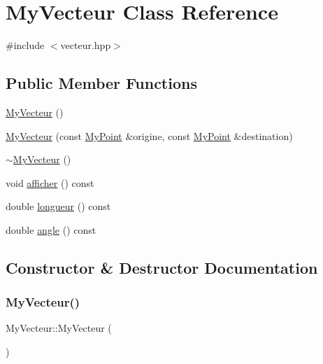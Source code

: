 \hypertarget{classMyVecteur}{}\section{My\+Vecteur Class Reference}
\label{classMyVecteur}


{\ttfamily \#include $<$vecteur.\+hpp$>$}

\subsection*{Public Member Functions}
\begin{DoxyCompactItemize}
\item 
\hyperlink{classMyVecteur_a6318886a52f3a09f30aecbbfc5e56121}{My\+Vecteur} ()
\item 
\hyperlink{classMyVecteur_a4e2be89ea76ce4e062603a1a5f139eb7}{My\+Vecteur} (const \hyperlink{classMyPoint}{My\+Point} \&origine, const \hyperlink{classMyPoint}{My\+Point} \&destination)
\item 
\hyperlink{classMyVecteur_aed208f92ee2d2f6e9c316f9688349c37}{$\sim$\+My\+Vecteur} ()
\item 
void \hyperlink{classMyVecteur_a1a7d4d738cc650239c18d0f1c0d88e3f}{afficher} () const
\item 
double \hyperlink{classMyVecteur_a11c7da61089ff7495cc81b78cfcfdd7a}{longueur} () const
\item 
double \hyperlink{classMyVecteur_a20233c42b105ad8f1fd4a62d2d005568}{angle} () const
\end{DoxyCompactItemize}


\subsection{Constructor \& Destructor Documentation}
\mbox{\label{classMyVecteur_a6318886a52f3a09f30aecbbfc5e56121}} 
\subsubsection{\texorpdfstring{My\+Vecteur()}{MyVecteur()}\hspace{0.1cm}{\footnotesize\ttfamily [1/2]}}
{\footnotesize\ttfamily My\+Vecteur\+::\+My\+Vecteur (\begin{DoxyParamCaption}{ }\end{DoxyParamCaption})}

